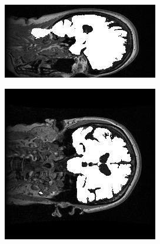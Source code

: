 \documentclass[11pt,a4paper,oneside]{report}
\begin{document}
\begin{figure}[H]
        \centering
        \begin{subfigure}[b]{0.3\textwidth}
                \includegraphics[width=\textwidth, height=0.8\textwidth, angle=90]{figures/diff/t1Seg_x.jpg}
        \end{subfigure}%
        \begin{subfigure}[b]{0.3\textwidth}
                \includegraphics[width=\textwidth, angle=90]{figures/diff/t1Seg_y.jpg}

\end{subfigure}
\end{figure}
\end{document}

